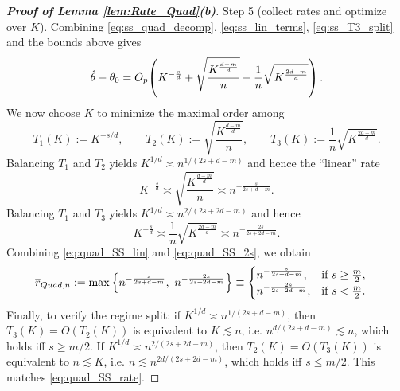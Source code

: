 \documentclass[12pt,american]{article}
\theoremstyle{definition}
\theoremstyle{plain}
\theoremstyle{definition}
\theoremstyle{plain}
\theoremstyle{plain}
\theoremstyle{plain}
\theoremstyle{plain}
\theoremstyle{plain}
\begin{document}
\begin{proof}[\textbf{Proof of Lemma \ref{lem:Rate_Quad}(b)}]
\smallskip
\noindent Step 5 (collect rates and optimize over $K$).
Combining \eqref{eq:ss_quad_decomp}, \eqref{eq:ss_lin_terms}, \eqref{eq:ss_T3_split} and the bounds above gives
\[
\hat{\theta}-\theta_0
=O_p\!\left(
K^{-\frac{s}{d}}
+\sqrt{\frac{K^{\frac{d-m}{d}}}{n}}
+\frac1n\sqrt{K^{\frac{2d-m}{d}}}
\right).
\]
We now choose $K$ to minimize the maximal order among
\[
T_{1}(K):=K^{-s/d},\qquad
T_{2}(K):=\sqrt{\frac{K^{\frac{d-m}{d}}}{n}},\qquad
T_{3}(K):=\frac1n\sqrt{K^{\frac{2d-m}{d}}}.
\]
Balancing $T_{1}$ and $T_{2}$ yields $K^{1/d}\asymp n^{1/(2s+d-m)}$ and hence the ``linear'' rate
\begin{equation}
K^{-\frac{s}{d}}\asymp\sqrt{\frac{K^{\frac{d-m}{d}}}{n}}\asymp n^{-\frac{s}{2s+d-m}}.\label{eq:quad_SS_lin}
\end{equation}
Balancing $T_{1}$ and $T_{3}$ yields $K^{1/d}\asymp n^{2/(2s+2d-m)}$ and hence
\begin{equation}
K^{-\frac{s}{d}}\asymp\frac1n\sqrt{K^{\frac{2d-m}{d}}}\asymp n^{-\frac{2s}{2s+2d-m}}.\label{eq:quad_SS_2s}
\end{equation}
Combining \eqref{eq:quad_SS_lin} and \eqref{eq:quad_SS_2s}, we obtain
\begin{align}
\ol r_{Quad,n}
&:=\max\left\{ n^{-\frac{s}{2s+d-m}},\ n^{-\frac{2s}{2s+2d-m}}\right\}
\equiv\begin{cases}
 n^{-\frac{s}{2s+d-m}}, & \text{if }s\geq\frac{m}{2},\\
 n^{-\frac{2s}{2s+2d-m}}, & \text{if }s<\frac{m}{2}.
\end{cases}\label{eq:quad_SS_rate}
\end{align}
Finally, to verify the regime split: if $K^{1/d}\asymp n^{1/(2s+d-m)}$, then $T_3(K)=O(T_2(K))$ is equivalent to $K\lesssim n$, i.e. $n^{d/(2s+d-m)}\lesssim n$, which holds iff $s\ge m/2$.
If $K^{1/d}\asymp n^{2/(2s+2d-m)}$, then $T_2(K)=O(T_3(K))$ is equivalent to $n\lesssim K$, i.e. $n\lesssim n^{2d/(2s+2d-m)}$, which holds iff $s\le m/2$.
This matches \eqref{eq:quad_SS_rate}.
\end{proof}
\end{document}
